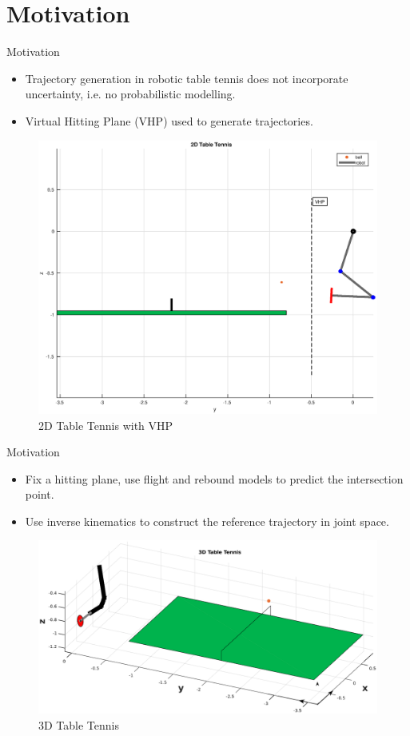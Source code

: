 \documentclass[handout]{beamer}
\begin{document}
\section{Motivation}
%
\begin{frame}{Motivation}
\begin{itemize}
\item Trajectory generation in robotic table tennis does not incorporate uncertainty, i.e. no probabilistic modelling.
\item Virtual Hitting Plane (VHP) used to generate trajectories.
\end{itemize}
\begin{figure}[t!]
\center
\includegraphics[scale=0.20]{tableTennis2D.eps}			
\caption{2D Table Tennis with VHP}
\label{robot1}
\end{figure}
\end{frame}
%
\begin{frame}{Motivation}
\begin{itemize}
\item Fix a hitting plane, use flight and rebound models to predict the intersection point. 
\item Use inverse kinematics to construct the reference trajectory in joint space.
\end{itemize}
\begin{figure}[t!]
\center
\includegraphics[scale=0.20]{tableTennis3D.eps}			
\caption{3D Table Tennis}
\label{robot2}
\end{figure}
\end{frame}
\end{document}
